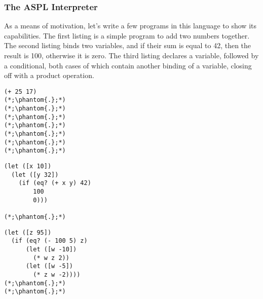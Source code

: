 \subsubsection*{The ASPL Interpreter}

As a means of motivation, let's write a few programs in this language to show its capabilities. The first listing is a simple program to add two numbers together. The second listing binds two variables, and if their sum is equal to 42, then the result is 100, otherwise it is zero. The third listing declares a variable, followed by a conditional, both cases of which contain another binding of a variable, closing off with a product operation.

\noindent %
\begin{minipage}[t]{0.32\textwidth}
\begin{lstlisting}[language=MyScheme, frame=single]
(+ 25 17)
(*;\phantom{.};*)
(*;\phantom{.};*)
(*;\phantom{.};*)
(*;\phantom{.};*)
(*;\phantom{.};*)
(*;\phantom{.};*)
(*;\phantom{.};*)
\end{lstlisting}
\end{minipage}%
\hfill %
\begin{minipage}[t]{0.32\textwidth}
\begin{lstlisting}[language=MyScheme, frame=single]
(let ([x 10])
  (let ([y 32])
    (if (eq? (+ x y) 42)
        100
        0)))

(*;\phantom{.};*)
\end{lstlisting}
\end{minipage}%
\hfill %
\begin{minipage}[t]{0.32\textwidth}
\begin{lstlisting}[language=MyScheme, frame=single]
(let ([z 95])
  (if (eq? (- 100 5) z)
      (let ([w -10])
        (* w z 2))
      (let ([w -5])
        (* z w -2))))
(*;\phantom{.};*)
(*;\phantom{.};*)
\end{lstlisting}
\end{minipage}

